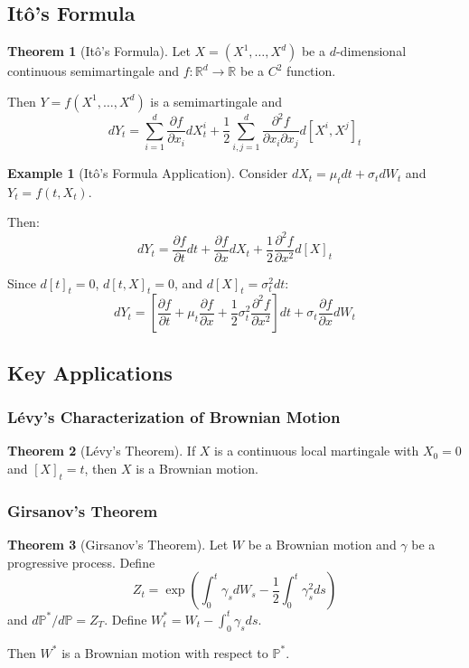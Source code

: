 \documentclass[11pt,a4paper]{article}
\theoremstyle{definition}
\newtheorem{theorem}{Theorem}[section]
\newtheorem{example}{Example}[section]
\begin{document}
\subsection{Itô's Formula}

\begin{theorem}[Itô's Formula]\label{thm:ito_formula}
Let $X = (X^1, \ldots, X^d)$ be a $d$-dimensional continuous semimartingale and $f: \mathbb{R}^d \to \mathbb{R}$ be a $C^2$ function.

Then $Y = f(X^1, \ldots, X^d)$ is a semimartingale and
\[
dY_t = \sum_{i=1}^d \frac{\partial f}{\partial x_i} dX^i_t + \frac{1}{2} \sum_{i,j=1}^d \frac{\partial^2 f}{\partial x_i \partial x_j} d[X^i, X^j]_t
\]
\end{theorem}

\begin{example}[Itô's Formula Application]\label{ex:ito_application}
Consider $dX_t = \mu_t dt + \sigma_t dW_t$ and $Y_t = f(t, X_t)$.

Then:
\[
dY_t = \frac{\partial f}{\partial t} dt + \frac{\partial f}{\partial x} dX_t + \frac{1}{2} \frac{\partial^2 f}{\partial x^2} d[X]_t
\]

Since $d[t]_t = 0$, $d[t,X]_t = 0$, and $d[X]_t = \sigma_t^2 dt$:
\[
dY_t = \left[\frac{\partial f}{\partial t} + \mu_t \frac{\partial f}{\partial x} + \frac{1}{2} \sigma_t^2 \frac{\partial^2 f}{\partial x^2}\right] dt + \sigma_t \frac{\partial f}{\partial x} dW_t
\]
\end{example}

\subsection{Key Applications}

\subsubsection{Lévy's Characterization of Brownian Motion}

\begin{theorem}[Lévy's Theorem]\label{thm:levy}
If $X$ is a continuous local martingale with $X_0 = 0$ and $[X]_t = t$, then $X$ is a Brownian motion.
\end{theorem}

\subsubsection{Girsanov's Theorem}

\begin{theorem}[Girsanov's Theorem]\label{thm:girsanov}
Let $W$ be a Brownian motion and $\gamma$ be a progressive process. Define
\[
Z_t = \exp\left(\int_0^t \gamma_s dW_s - \frac{1}{2} \int_0^t \gamma_s^2 ds\right)
\]
and $d\mathbb{P}^*/d\mathbb{P} = Z_T$. Define $W^*_t = W_t - \int_0^t \gamma_s ds$.

Then $W^*$ is a Brownian motion with respect to $\mathbb{P}^*$.
\end{theorem}
\end{document}
